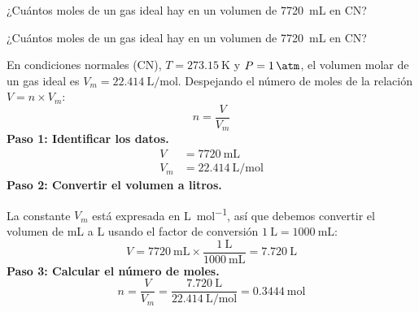 \begin{exercise}
    ¿Cuántos moles de un gas ideal hay en un volumen de \qty{7720}{\mL} en CN?
    \begin{solu}
        ¿Cuántos moles de un gas ideal hay en un volumen de \qty{7720}{\mL} en CN?

        En condiciones normales (CN), $T = \qty{273.15}{\kelvin}$ y $P = \qty{1}{\atm}$,
        el volumen molar de un gas ideal es $V_m = \qty{22.414}{\liter\per\mol}$. Despejando
        el número de moles de la relación $V = n \times V_m$:
        \begin{equation*}
            n = \frac{V}{V_m}
        \end{equation*}
        \textbf{Paso 1: Identificar los datos.}
        \begin{align*}
            V   &= \qty{7720}{\mL} \\
            V_m &= \qty{22.414}{\liter\per\mol}
        \end{align*}
        \textbf{Paso 2: Convertir el volumen a litros.}

        La constante $V_m$ está expresada en \unit{\liter\per\mol}, así que debemos convertir
        el volumen de mL a L usando el factor de conversión
        $\qty{1}{\liter} = \qty{1000}{\mL}$:
        \begin{equation*}
            V = \qty{7720}{\mL} \times \frac{\qty{1}{\liter}}{\qty{1000}{\mL}}
            = \qty{7.720}{\liter}
        \end{equation*}
        \textbf{Paso 3: Calcular el número de moles.}
        \begin{equation*}
            n = \frac{V}{V_m} = \frac{\qty{7.720}{\liter}}{\qty{22.414}{\liter\per\mol}}
            = \boxed{\qty{0.3444}{\mol}}
        \end{equation*}
    \end{solu}
\end{exercise}
